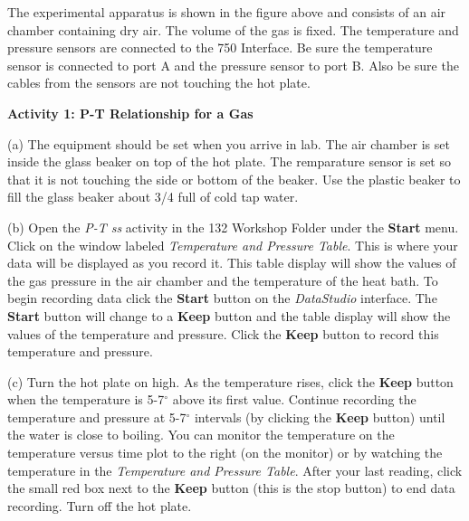 The experimental apparatus is shown in the figure above and consists
of an air chamber containing dry air. The volume of the gas is fixed. 
The temperature and pressure sensors are connected to the 750 Interface. 
Be sure the temperature sensor is connected to port A and the pressure sensor 
to port B. Also be sure the cables from the sensors are not touching the hot 
plate.

\textbf{Activity 1: P-T Relationship for a Gas}


(a) The equipment should be set when you arrive in lab. The air chamber is set 
inside the glass beaker on top of the hot plate. The remparature sensor is set 
so that it is not touching the side or bottom of the beaker. Use the plastic 
beaker to fill the glass beaker about 3/4 full of cold tap water.

(b) Open the {\it P-T ss} activity in the 132 Workshop Folder under the
{\bf Start} menu.
Click on the window labeled \textit{Temperature and Pressure Table}. 
This is where your data will be displayed as you record
it. This table display will show the values of the gas pressure in the air 
chamber and the temperature of the heat bath. 
To begin recording data click
the {\bf Start} button on the {\it DataStudio} interface. 
The {\bf Start} button will change to a {\bf Keep} button and the table
display will show the values of the temperature and pressure. 
Click the {\bf Keep} button to record this temperature and pressure.

(c) Turn the hot plate on high.  As the temperature rises, click the {\bf Keep} button when the temperature is 5-7\( ^{\circ } \) above its first value.  Continue recording the temperature and pressure at 5-7\( ^{\circ } \) intervals (by clicking the {\bf Keep} button) until the water is close to boiling.  You can monitor the temperature on the temperature versus time plot to the right (on the monitor) or by watching the temperature in the \textit{Temperature and Pressure Table}.  After your last reading, click the small red box next to the {\bf Keep} button (this is the stop button) to end data recording. Turn off the hot plate.

